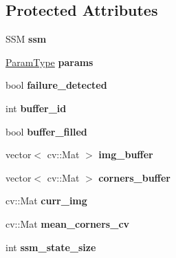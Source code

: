 \subsection*{Protected Attributes}
\begin{DoxyCompactItemize}
\item 
\hypertarget{classParallelSM_ad16d4e1836141f6a85f08142ffa2ed78}{S\-S\-M {\bfseries ssm}}\label{classParallelSM_ad16d4e1836141f6a85f08142ffa2ed78}

\item 
\hypertarget{classParallelSM_a7df613b3f6c95155d74e08e4a1935d70}{\hyperlink{structParallelParams}{Param\-Type} {\bfseries params}}\label{classParallelSM_a7df613b3f6c95155d74e08e4a1935d70}

\item 
\hypertarget{classParallelSM_ab25f7d8854c3eb7508522c16349216de}{bool {\bfseries failure\-\_\-detected}}\label{classParallelSM_ab25f7d8854c3eb7508522c16349216de}

\item 
\hypertarget{classParallelSM_a6fc050c8b04236ccb805823b39b27733}{int {\bfseries buffer\-\_\-id}}\label{classParallelSM_a6fc050c8b04236ccb805823b39b27733}

\item 
\hypertarget{classParallelSM_a1d751179c10fa5bce8d691fce72845ab}{bool {\bfseries buffer\-\_\-filled}}\label{classParallelSM_a1d751179c10fa5bce8d691fce72845ab}

\item 
\hypertarget{classParallelSM_abe00faae9e94f1f2850a35f7532fbf67}{vector$<$ cv\-::\-Mat $>$ {\bfseries img\-\_\-buffer}}\label{classParallelSM_abe00faae9e94f1f2850a35f7532fbf67}

\item 
\hypertarget{classParallelSM_a3755e2079cfa021e3db703902d5d8134}{vector$<$ cv\-::\-Mat $>$ {\bfseries corners\-\_\-buffer}}\label{classParallelSM_a3755e2079cfa021e3db703902d5d8134}

\item 
\hypertarget{classParallelSM_af54120d7d1ab4ebd60bd5c8bd9132a84}{cv\-::\-Mat {\bfseries curr\-\_\-img}}\label{classParallelSM_af54120d7d1ab4ebd60bd5c8bd9132a84}

\item 
\hypertarget{classParallelSM_a5b7b7568ce7660eede019abffa650862}{cv\-::\-Mat {\bfseries mean\-\_\-corners\-\_\-cv}}\label{classParallelSM_a5b7b7568ce7660eede019abffa650862}

\item 
\hypertarget{classParallelSM_a2d600739f559fbe0f28390d770ef4edc}{int {\bfseries ssm\-\_\-state\-\_\-size}}\label{classParallelSM_a2d600739f559fbe0f28390d770ef4edc}


\end{DoxyCompactItemize}
